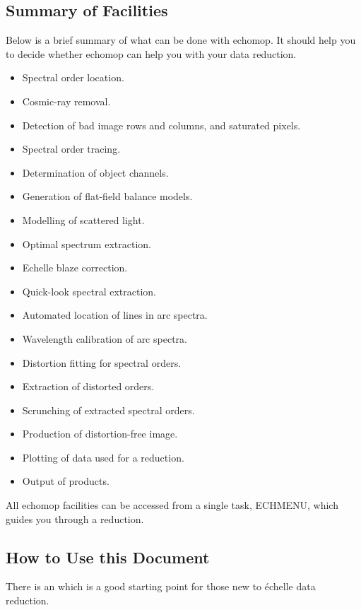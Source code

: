 \subsection{Summary of Facilities}

Below is a brief summary of what can be done with {\sc echomop}.
It should help you to decide whether {\sc echomop} can help you with your
data reduction.

\begin{itemize}

\item Spectral order location.
\item Cosmic-ray removal.
\item Detection of bad image rows and columns, and saturated pixels.
\item Spectral order tracing.
\item Determination of object channels.
\item Generation of flat-field balance models.
\item Modelling of scattered light.
\item Optimal spectrum extraction.
\item Echelle blaze correction.
\item Quick-look spectral extraction.
\item Automated location of lines in arc spectra.
\item Wavelength calibration of arc spectra.
\item Distortion fitting for spectral orders.
\item Extraction of distorted orders.
\item Scrunching of extracted spectral orders.
\item Production of distortion-free image.
\item Plotting of data used for a reduction.
\item Output of products.

\end{itemize}

All {\sc echomop} facilities can be accessed from a single task, ECHMENU,
which guides you through a reduction.


\subsection{ How to Use this Document}

There is an 
which is a good starting point for those new to \'{e}chelle data reduction.


